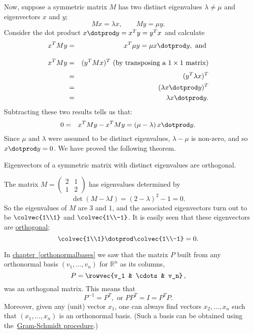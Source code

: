 Now, suppose a symmetric matrix $M$ has two distinct eigenvalues $\lambda \neq \mu$ and eigenvectors $x$ and $y$;
\[
Mx=\lambda x, \qquad My=\mu y.
\] 
Consider the dot product $x\dotprod y = x^Ty = y^Tx$ and calculate
\begin{eqnarray*}
x^TM y &=& x^T\mu y = \mu x\dotprod y, \text{ and }\\[3mm]
x^TM y &=& (y^TMx)^T \text{ (by transposing a $1\times 1$ matrix)}\\[1mm]
       &=& (y^T\lambda x)^T \\
       &=& (\lambda x\dotprod y)^T \\
             &=& \lambda x\dotprod y.
\end{eqnarray*}
Subtracting these two results tells us that:
\begin{eqnarray*}
0 &=& x^TMy-x^TMy=(\mu-\lambda)\,x\dotprod y.
\end{eqnarray*}
Since $\mu$ and $\lambda$ were assumed to be distinct eigenvalues, $\lambda-\mu$ is non-zero, and so $x\dotprod y=0$.  We have proved the following theorem.

\begin{theorem}
Eigenvectors of a symmetric matrix with distinct eigenvalues are orthogonal.
\end{theorem}


\begin{example}
The matrix $M=\begin{pmatrix}2&1\\1&2\end{pmatrix}$
has eigenvalues determined by
\[
\det(M-\lambda I)=(2-\lambda)^2-1=0.
\] 
So the eigenvalues of $M$ are $3$ and $1$, and the associated eigenvectors turn out to be 
$\colvec{1\\1}$ and $\colvec{1\\-1}$.  It is easily seen that these eigenvectors are \hyperref[orthogonal]{orthogonal}; 
\[
\colvec{1\\1} \dotprod \colvec{1\\-1}=0.
\]
\end{example}

In \hyperlink{basisorthog}{chapter~\ref{orthonormalbases}} we saw that the matrix $P$ built from any orthonormal basis  $(v_1,\ldots, v_n )$
for ${\mathbb R}^n$ as its columns,
\[
P=\rowvec{v_1 & \cdots & v_n}\, ,
\]
was an orthogonal matrix. This means that 
\[
P^{-1}=P^T, \text{ or } PP^T=I=P^TP.
\]
Moreover, given any (unit) vector $x_1$, one can always find vectors $x_2, \ldots, x_n$ such that $(x_1,\ldots, x_n)$ is an orthonormal basis.  (Such a basis can be obtained using the~\hyperref[GramSchmidt]{Gram-Schmidt procedure}.)

